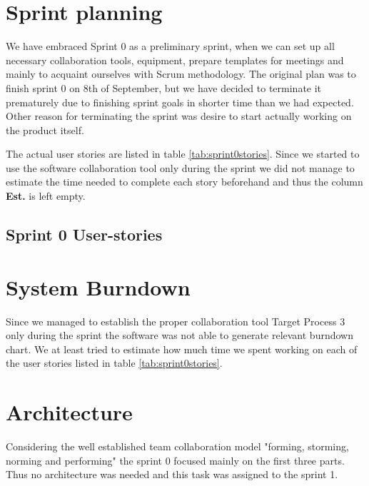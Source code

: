 \section{Sprint planning}
We have embraced Sprint 0 as a preliminary sprint, when we can set up all necessary collaboration tools, equipment, prepare templates for meetings and mainly to acquaint ourselves with Scrum methodology. The original plan was to finish sprint 0 on 8th of September, but we have decided to terminate it prematurely due to finishing sprint goals in shorter time than we had expected. Other reason for terminating the sprint was desire to start actually working on the product itself.

The actual user stories are listed in table \ref{tab:sprint0stories}. Since we started to use the software collaboration tool only during the sprint we did not manage to estimate the time needed to complete each story beforehand and thus the column \textbf{Est.} is left empty.

\subsection{Sprint 0 User-stories}




\section{System Burndown}
Since we managed to establish the proper collaboration tool Target Process 3 only during the sprint the software was not able to generate relevant burndown chart.
We at least tried to estimate how much time we spent working on each of the user stories listed in table \ref{tab:sprint0stories}.

\section{Architecture} \label{txt:sprint0architecture}

Considering the well established team collaboration model "forming, storming, norming and performing" the sprint 0 focused mainly on the first three parts.
Thus no architecture was needed and this task was assigned to the sprint 1.

